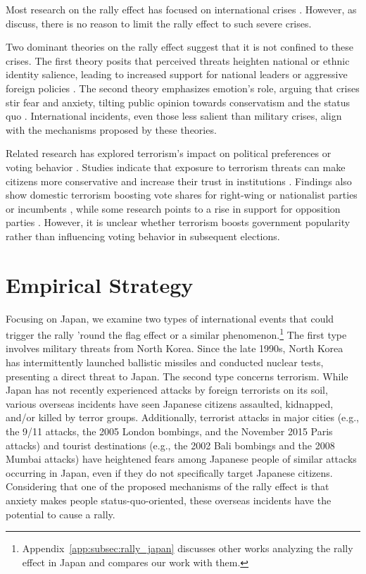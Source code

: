 \documentclass[letterpaper,12pt]{scrartcl}
\begin{document}
Most research on the rally effect has focused on international crises \citep{lee1977,Oneal1995PolitBehav,jentleson1998,Baker2001JCR,Chapman2004JCR}. However, as \citet{seo2023} discuss, there is no reason to limit the rally effect to such severe crises.

Two dominant theories on the rally effect suggest that it is not confined to these crises. The first theory posits that perceived threats heighten national or ethnic identity salience, leading to increased support for national leaders or aggressive foreign policies \citep{Huddy2005AJPS,Kam2008POQ,Feinstein2018SocSciRes}. The second theory emphasizes emotion's role, arguing that crises stir fear and anxiety, tilting public opinion towards conservatism and the status quo \citep{Jost2003PsycholBull}. International incidents, even those less salient than military crises, align with the mechanisms proposed by these theories.

Related research has explored terrorism's impact on political preferences or voting behavior \citep{godefroidt2023}. Studies indicate that exposure to terrorism threats can make citizens more conservative \citep{Bonanno2006BasicApplSocPsychol,Echebarria-Echabe2006EurJSocPsychol,Nail2009SocJusticeRes} and increase their trust in institutions \citep{Dinesen2013PolitPsychol}. Findings also show domestic terrorism boosting vote shares for right-wing or nationalist parties \citep{Berrebi2008APSR,Getmansky2014APSR,hintson2023a} or incumbents \citep{falco-gimeno2023,umitforthcoming}, while some research points to a rise in support for opposition parties \citep{bali2007,kibris2011,holman2022}. However, it is unclear whether terrorism boosts government popularity rather than influencing voting behavior in subsequent elections.

\section*{Empirical Strategy\centering}

Focusing on Japan, we examine two types of international events that could trigger the rally 'round the flag effect or a similar phenomenon.\footnote{Appendix~\ref{app:subsec:rally_japan} discusses other works analyzing the rally effect in Japan and compares our work with them.} The first type involves military threats from North Korea. Since the late 1990s, North Korea has intermittently launched ballistic missiles and conducted nuclear tests, presenting a direct threat to Japan. The second type concerns terrorism. While Japan has not recently experienced attacks by foreign terrorists on its soil, various overseas incidents have seen Japanese citizens assaulted, kidnapped, and/or killed by terror groups. Additionally, terrorist attacks in major cities (e.g., the 9/11 attacks, the 2005 London bombings, and the November 2015 Paris attacks) and tourist destinations (e.g., the 2002 Bali bombings and the 2008 Mumbai attacks) have heightened fears among Japanese people of similar attacks occurring in Japan, even if they do not specifically target Japanese citizens. Considering that one of the proposed mechanisms of the rally effect is that anxiety makes people status-quo-oriented, these overseas incidents have the potential to cause a rally.
\end{document}
